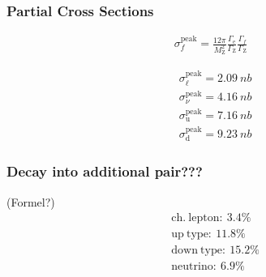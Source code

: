 \documentclass[11pt, a4paper]{article}
\numberwithin{equation}{section}
\newcommand{\korr}[1]{{\color{red}(#1)}}
\begin{document}
\subsubsection{Partial Cross Sections}
\cite{instructions}
\begin{align*}
	\sigma_f^\mathrm{peak} = \frac{12 \pi}{M_\mathrm{Z}^2} \frac{\Gamma_\mathrm{e}}{\Gamma_\mathrm{Z}} \frac{\Gamma_f}{\Gamma_\mathrm{Z}}
\end{align*}

\begin{align*}
	&\sigma_\ell^\mathrm{peak} = \SI{2.09}{nb} \\
	&\sigma_\nu^\mathrm{peak} = \SI{4.16}{nb} \\
	&\sigma_\mathrm{u}^\mathrm{peak} = \SI{7.16}{nb} \\
	&\sigma_\mathrm{d}^\mathrm{peak} = \SI{9.23}{nb} 
\end{align*}

\subsubsection{Decay into additional pair???}
\korr{Formel?}
\begin{align*}
	&\mathrm{ch.~lepton:} ~ 3.4\% \\
	&\mathrm{up~type:} ~ 11.8 \% \\
	&\mathrm{down~type:} ~ 15.2 \% \\
	&\mathrm{neutrino:} ~ 6.9 \%
\end{align*}
\end{document}
